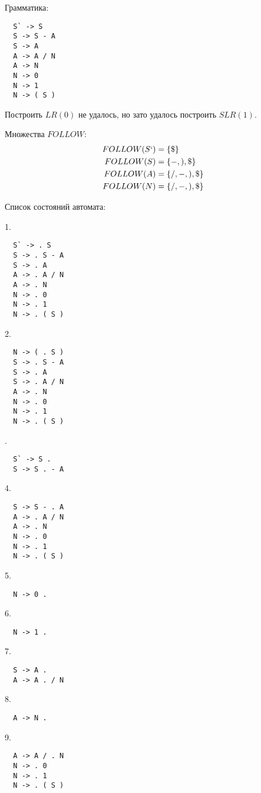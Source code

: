Грамматика:
\begin{lstlisting}
  S` -> S
  S -> S - A 
  S -> A
  A -> A / N 
  A -> N
  N -> 0 
  N -> 1 
  N -> ( S )
\end{lstlisting}

Построить $LR(0)$ не удалось, но зато удалось построить 
$SLR(1)$.

Множества $FOLLOW$:
\begin{align*}
  FOLLOW(S`) &= \{ \$ \} \\
  FOLLOW(S) &= \{ -, ), \$ \} \\
  FOLLOW(A) &= \{ /, -, ), \$ \} \\
  FOLLOW(N) &= \{ /, -, ), \$ \}
\end{align*}  

Список состояний автомата:

1.
\begin{lstlisting}
  S` -> . S
  S -> . S - A
  S -> . A
  A -> . A / N
  A -> . N
  N -> . 0
  N -> . 1
  N -> . ( S )
\end{lstlisting}

2.
\begin{lstlisting}
  N -> ( . S )
  S -> . S - A
  S -> . A
  S -> . A / N
  A -> . N
  N -> . 0
  N -> . 1
  N -> . ( S )
\end{lstlisting}
.
\begin{lstlisting}
  S` -> S .
  S -> S . - A
\end{lstlisting}

4.
\begin{lstlisting}
  S -> S - . A
  A -> . A / N
  A -> . N
  N -> . 0
  N -> . 1
  N -> . ( S )
\end{lstlisting}

5.
\begin{lstlisting}
  N -> 0 .  
\end{lstlisting}

6.
\begin{lstlisting}
  N -> 1 .
\end{lstlisting}

7.
\begin{lstlisting}
  S -> A .
  A -> A . / N
\end{lstlisting}

8.
\begin{lstlisting}
  A -> N .
\end{lstlisting}

9.
\begin{lstlisting}
  A -> A / . N
  N -> . 0
  N -> . 1
  N -> . ( S )  
\end{lstlisting}

